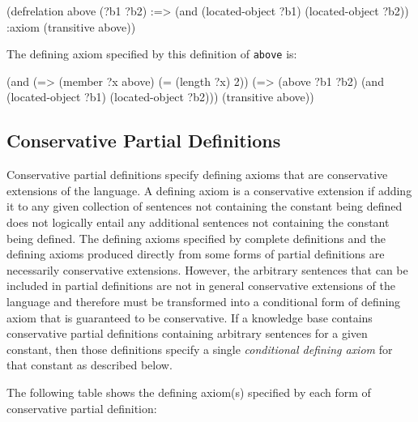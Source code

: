\medskip
\beginverbatim
(defrelation above (?b1 ?b2)
     :=> (and (located-object ?b1) (located-object ?b2))
     :axiom (transitive above))

\endverbatim
\medskip

The defining axiom specified by this definition of {\tt above} is:

\medskip
\beginverbatim
(and (=> (member ?x above) (= (length ?x) 2))
     (=> (above ?b1 ?b2)
         (and (located-object ?b1) (located-object ?b2)))
     (transitive above))
\endverbatim
\medskip

\subsection{Conservative Partial Definitions}

Conservative partial definitions specify defining axioms that are conservative
extensions of the language.  A defining axiom is a conservative extension if
adding it to any given collection of sentences not containing the constant
being defined does not logically entail any additional sentences not
containing the constant being defined.  The defining axioms specified by
complete definitions and the defining axioms produced directly from some forms of partial definitions are necessarily conservative extensions.  However, the arbitrary sentences that can be included in partial definitions are not in
general conservative extensions of the language and therefore must be
transformed into a conditional form of defining axiom that is guaranteed to be
conservative.  If a knowledge base contains conservative partial definitions
containing arbitrary sentences for a given constant, then those definitions
specify a single {\it conditional defining axiom} for that constant as
described below.

The following table shows the defining axiom(s) specified by each form of
conservative partial definition:

